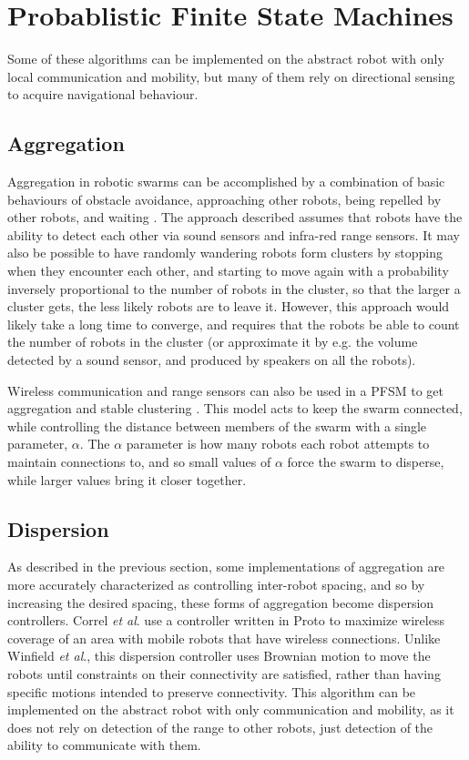 \documentclass[]{article}
\begin{document}
\section{Probablistic Finite State Machines}

Some of these algorithms can be implemented on the abstract robot with only local communication and mobility, but many of them rely on directional sensing to acquire navigational behaviour. 

\subsection{Aggregation}

Aggregation in robotic swarms can be accomplished by a combination of basic behaviours of obstacle avoidance, approaching other robots, being repelled by other robots, and waiting \cite{soysal2005probabilistic}.
The approach described assumes that robots have the ability to detect each other via sound sensors and infra-red range sensors. 
It may also be possible to have randomly wandering robots form clusters by stopping when they encounter each other, and starting to move again with a probability inversely proportional to the number of robots in the cluster, so that the larger a cluster gets, the less likely robots are to leave it. 
However, this approach would likely take a long time to converge, and requires that the robots be able to count the number of robots in the cluster (or approximate it by e.g. the volume detected by a sound sensor, and produced by speakers on all the robots).

Wireless communication and range sensors can also be used in a PFSM to get aggregation and stable clustering \cite{winfield2008modelling}.
This model acts to keep the swarm connected, while controlling the distance between members of the swarm with a single parameter, $\alpha$.
The $\alpha$ parameter is how many robots each robot attempts to maintain connections to, and so small values of $\alpha$ force the swarm to disperse, while larger values bring it closer together. 

\subsection{Dispersion}

As described in the previous section, some implementations of aggregation are more accurately characterized as controlling inter-robot spacing, and so by increasing the desired spacing, these forms of aggregation become dispersion controllers. 
Correl \textit{et al}. use a controller written in Proto to maximize wireless coverage of an area with mobile robots that have wireless connections.
Unlike Winfield \textit{et al}., this dispersion controller uses Brownian motion to move the robots until constraints on their connectivity are satisfied, rather than having specific motions intended to preserve connectivity. 
This algorithm can be implemented on the abstract robot with only communication and mobility, as it does not rely on detection of the range to other robots, just detection of the ability to communicate with them. 
\end{document}
